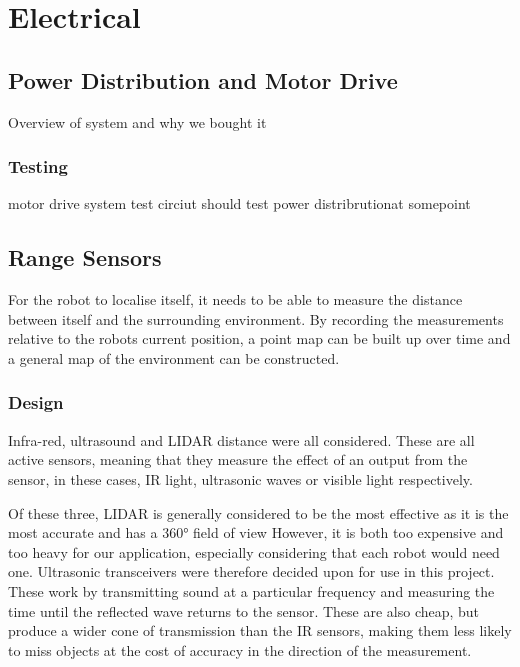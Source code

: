 
\chapter{Electrical}\label{electrical}

\section{Power Distribution and Motor Drive}\label{elec/poweranddrive}
Overview of system and why we bought it
\subsection{Testing}\label{elec/poweranddrive/test}
motor drive system test circiut
should test power distribrutionat somepoint 




\section{Range Sensors}\label{elec/range}
For the robot to localise itself, it needs to be able to measure the distance between itself and the surrounding environment. By recording the measurements relative to the robots current position, a point map can be built up over time and a general map of the environment can be constructed. 

\subsection{Design}\label{elec/range/design}
Infra-red, ultrasound and LIDAR distance were all considered. These are all active sensors, meaning that they measure the effect of an output from the sensor, in these cases, IR light, ultrasonic waves or visible light respectively. 

Of these three, LIDAR is generally considered to be the most effective as it is the most accurate and has a \ang{360} field of view However, it is both too expensive and too heavy for our application, especially considering that each robot would need one. 
Ultrasonic transceivers were therefore decided upon for use in this project. These work by transmitting sound at a particular frequency and measuring the time until the reflected wave returns to the sensor. These are also cheap, but produce a wider cone of transmission than the IR sensors, making them less likely to miss objects at the cost of accuracy in the direction of the measurement. 

